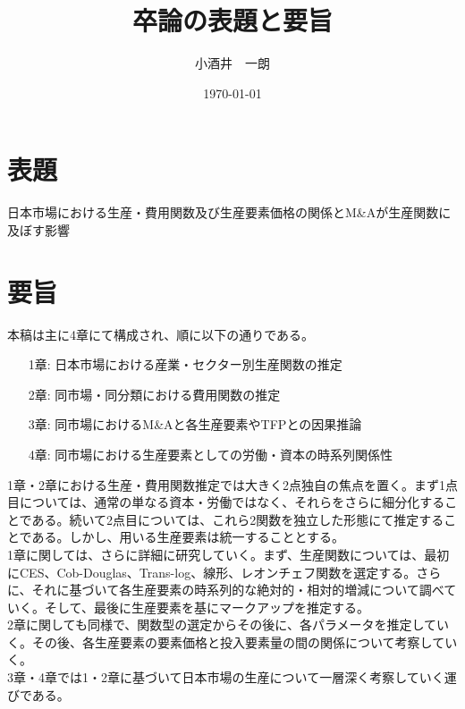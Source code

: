 \documentclass[dvipdfmx,uplatex]{jsarticle}
\title{卒論の表題と要旨}
\author{小酒井　一朗}
\date{\today}
\begin{document}
\maketitle
\section{表題}
日本市場における生産・費用関数及び生産要素価格の関係とM\&Aが生産関数に及ぼす影響

\section{要旨}
本稿は主に4章にて構成され、順に以下の通りである。
\begin{itemize}
    \item[1章:] 日本市場における産業・セクター別生産関数の推定
    \item[2章:] 同市場・同分類における費用関数の推定
    \item[3章:] 同市場におけるM\&Aと各生産要素やTFPとの因果推論
    \item[4章:] 同市場における生産要素としての労働・資本の時系列関係性
\end{itemize}
1章・2章における生産・費用関数推定では大きく2点独自の焦点を置く。まず1点目については、通常の単なる資本・労働ではなく、それらをさらに細分化することである。続いて2点目については、これら2関数を独立した形態にて推定することである。しかし、用いる生産要素は統一することとする。\\
1章に関しては、さらに詳細に研究していく。まず、生産関数については、最初にCES、Cob-Douglas、Trans-log、線形、レオンチェフ関数を選定する。さらに、それに基づいて各生産要素の時系列的な絶対的・相対的増減について調べていく。そして、最後に生産要素を基にマークアップを推定する。\\
2章に関しても同様で、関数型の選定からその後に、各パラメータを推定していく。その後、各生産要素の要素価格と投入要素量の間の関係について考察していく。\\
3章・4章では1・2章に基づいて日本市場の生産について一層深く考察していく運びである。
\end{document}
